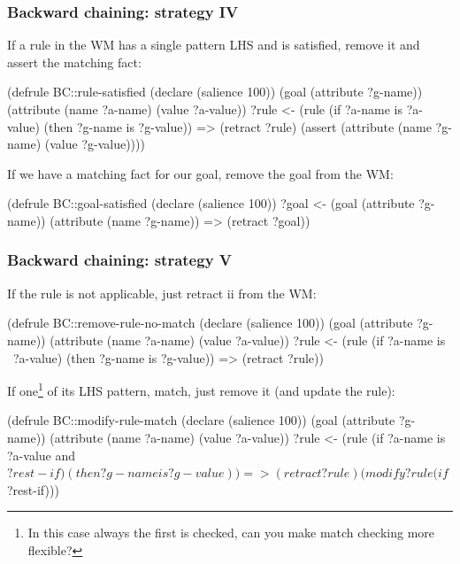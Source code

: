\documentclass[xcolor={usenames,dvipsnames,svgnames}, compress]{beamer}
\begin{document}
\begin{frame}[fragile]
  \frametitle{Backward chaining: strategy IV}
  If a rule in the WM has a single pattern LHS and is satisfied,
  remove it and assert the matching fact:
  \begin{clips-code}[numbers=none]
    (defrule BC::rule-satisfied
        (declare (salience 100))
        (goal (attribute ?g-name))
        (attribute (name ?a-name) (value ?a-value))
        ?rule <- (rule (if ?a-name is ?a-value) 
                       (then ?g-name is ?g-value))
        =>
        (retract ?rule)
        (assert (attribute (name ?g-name) (value ?g-value))))
  \end{clips-code}
  If we have a matching fact for our goal, remove the goal from the WM:    
  \begin{clips-code}[numbers=none]
    (defrule BC::goal-satisfied
        (declare (salience 100))
        ?goal <- (goal (attribute ?g-name))
        (attribute (name ?g-name))
        =>
        (retract ?goal))


  \end{clips-code}
\end{frame}

\begin{frame}[fragile]
  \frametitle{Backward chaining: strategy V}
  If the rule is not applicable, just retract ii from the WM:
  \begin{clips-code}[numbers=none]
    (defrule BC::remove-rule-no-match
        (declare (salience 100))
        (goal (attribute ?g-name))
        (attribute (name ?a-name) (value ?a-value))
        ?rule <- (rule (if ?a-name is ~?a-value) 
                       (then ?g-name is ?g-value))
        =>
        (retract ?rule))

    
  \end{clips-code}
  If one\footnote{In this case always the first is checked, can you
    make match checking more flexible?} of its LHS pattern, match, just remove it (and update the rule):    
  \begin{clips-code}[numbers=none]
    (defrule BC::modify-rule-match
        (declare (salience 100))
        (goal (attribute ?g-name))
        (attribute (name ?a-name) (value ?a-value))
        ?rule <- (rule (if ?a-name is ?a-value and $?rest-if) 
                       (then ?g-name is ?g-value))
        =>
        (retract ?rule)
        (modify ?rule (if $?rest-if)))
  \end{clips-code}
\end{frame}
\end{document}
